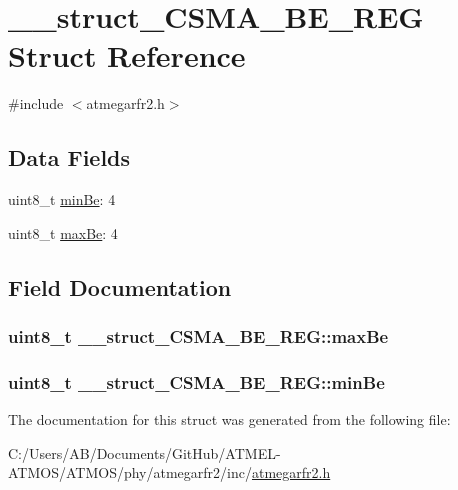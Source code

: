 \hypertarget{struct____struct___c_s_m_a___b_e___r_e_g}{\section{\-\_\-\-\_\-struct\-\_\-\-C\-S\-M\-A\-\_\-\-B\-E\-\_\-\-R\-E\-G Struct Reference}
\label{struct____struct___c_s_m_a___b_e___r_e_g}
}


{\ttfamily \#include $<$atmegarfr2.\-h$>$}

\subsection*{Data Fields}
\begin{DoxyCompactItemize}
\item 
uint8\-\_\-t \hyperlink{struct____struct___c_s_m_a___b_e___r_e_g_a6c818f0a1861826b3cbbb4b62cafecc8}{min\-Be}\-: 4
\item 
uint8\-\_\-t \hyperlink{struct____struct___c_s_m_a___b_e___r_e_g_ae8fac3ce561a53cc4de36a2810526c5d}{max\-Be}\-: 4
\end{DoxyCompactItemize}


\subsection{Field Documentation}
\hypertarget{struct____struct___c_s_m_a___b_e___r_e_g_ae8fac3ce561a53cc4de36a2810526c5d}{
\subsubsection[{max\-Be}]{\setlength{\rightskip}{0pt plus 5cm}uint8\-\_\-t \-\_\-\-\_\-struct\-\_\-\-C\-S\-M\-A\-\_\-\-B\-E\-\_\-\-R\-E\-G\-::max\-Be}}\label{struct____struct___c_s_m_a___b_e___r_e_g_ae8fac3ce561a53cc4de36a2810526c5d}
\hypertarget{struct____struct___c_s_m_a___b_e___r_e_g_a6c818f0a1861826b3cbbb4b62cafecc8}{
\subsubsection[{min\-Be}]{\setlength{\rightskip}{0pt plus 5cm}uint8\-\_\-t \-\_\-\-\_\-struct\-\_\-\-C\-S\-M\-A\-\_\-\-B\-E\-\_\-\-R\-E\-G\-::min\-Be}}\label{struct____struct___c_s_m_a___b_e___r_e_g_a6c818f0a1861826b3cbbb4b62cafecc8}


The documentation for this struct was generated from the following file\-:\begin{DoxyCompactItemize}
\item 
C\-:/\-Users/\-A\-B/\-Documents/\-Git\-Hub/\-A\-T\-M\-E\-L-\/\-A\-T\-M\-O\-S/\-A\-T\-M\-O\-S/phy/atmegarfr2/inc/\hyperlink{atmegarfr2_8h}{atmegarfr2.\-h}\end{DoxyCompactItemize}
